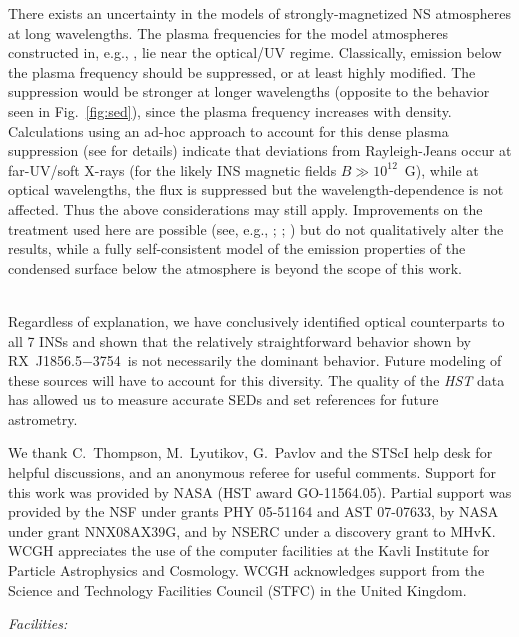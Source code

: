 \documentclass[iop]{emulateapj}
\newcommand{\rxjw}{RX~J1856.5$-$3754}
\begin{document}
There exists an uncertainty in the models of strongly-magnetized NS
atmospheres at long wavelengths.  The plasma frequencies for the model
atmospheres constructed in, e.g., \citet{hpc08}, lie near the
optical/UV regime.  Classically, emission below the plasma frequency
should be suppressed, or at least highly modified.  The suppression
would be stronger at longer wavelengths (opposite to the behavior seen
in Fig.~\ref{fig:sed}), since the plasma frequency increases with
density.  Calculations using an ad-hoc approach to account for this
dense plasma suppression (see \citealt{hlpc03} for details) indicate
that deviations from Rayleigh-Jeans occur at far-UV/soft X-rays (for
the likely INS magnetic fields $B\gg 10^{12}$~G), while at optical
wavelengths, the flux is suppressed but the wavelength-dependence is
not affected.  Thus the above considerations may still apply.
Improvements on the treatment used here are possible (see, e.g.,
\citealt{brink80}; \citealt*{tzd04,pamp05};
\citealt{valpa05,hkc+07}) but do not qualitatively alter the results,
while a fully self-consistent model of the emission properties of the
condensed surface below the atmosphere is beyond the scope of this
work.

\ \\

Regardless of explanation, we have conclusively identified optical
counterparts to all 7 INSs and shown that the relatively
straightforward behavior shown by \rxjw\ is not necessarily the
dominant behavior.  Future modeling of these sources will have to
account for this diversity.  The quality of the \textit{HST} data has
allowed us to measure accurate SEDs and set references for future
astrometry.  

\acknowledgements We thank C.~Thompson, M.~Lyutikov, G.~Pavlov and the
STScI help desk for helpful discussions, and an anonymous referee for
useful comments.  Support for this work was provided by NASA (HST
award GO-11564.05).  Partial support was provided by the NSF under
grants PHY 05-51164 and AST 07-07633, by NASA under grant NNX08AX39G,
and by NSERC under a discovery grant to MHvK.  WCGH appreciates the
use of the computer facilities at the Kavli Institute for Particle
Astrophysics and Cosmology.  WCGH acknowledges support from the
Science and Technology Facilities Council (STFC) in the United
Kingdom.

{\it Facilities:} 
\end{document}
